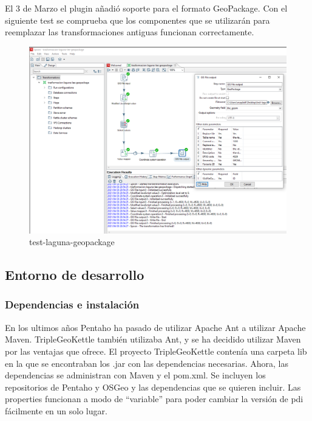 El 3 de Marzo el plugin añadió soporte para el formato GeoPackage. Con el siguiente test se comprueba que los
componentes que se utilizarán para reemplazar las transformaciones antiguas funcionan correctamente.

\begin{figure}[H]
    \includegraphics[width=\textwidth]{images/test-laguna-geopackage.png}
    \centering
    \caption{test-laguna-geopackage}
    \label{fig:test-laguna-geopackage}
\end{figure}

\subsection{Entorno de desarrollo}

\subsubsection{Dependencias e instalación}

En los ultimos años Pentaho ha pasado de utilizar Apache Ant a utilizar Apache Maven. TripleGeoKettle también
utilizaba Ant, y se ha decidido utilizar Maven por las ventajas que ofrece. El proyecto TripleGeoKettle contenía
una carpeta lib en la que se encontraban los .jar con las dependencias necesarias. Ahora, las dependencias se
administran con Maven y el pom.xml. Se incluyen los repositorios de Pentaho y OSGeo y las dependencias que se
quieren incluir. Las properties funcionan a modo de ``variable'' para poder cambiar la versión de pdi fácilmente
en un solo lugar.




